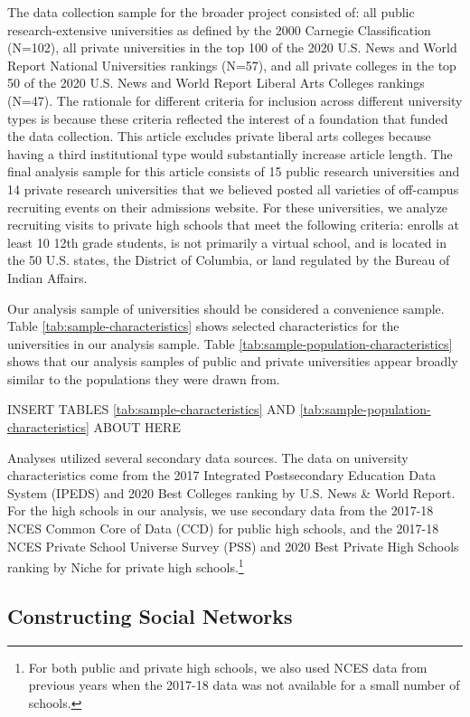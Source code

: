 \documentclass[
  12pt,
]{article}
\begin{document}
The data collection sample for the broader project consisted of: all public research-extensive universities as defined by the 2000 Carnegie Classification (N=102), all private universities in the top 100 of the 2020 U.S. News and World Report National Universities rankings (N=57), and all private colleges in the top 50 of the 2020 U.S. News and World Report Liberal Arts Colleges rankings (N=47). The rationale for different criteria for inclusion across different university types is because these criteria reflected the interest of a foundation that funded the data collection. This article excludes private liberal arts colleges because having a third institutional type would substantially increase article length. The final analysis sample for this article consists of 15 public research universities and 14 private research universities that we believed posted all varieties of off-campus recruiting events on their admissions website. For these universities, we analyze recruiting visits to private high schools that meet the following criteria: enrolls at least 10 12th grade students, is not primarily a virtual school, and is located in the 50 U.S. states, the District of Columbia, or land regulated by the Bureau of Indian Affairs.

Our analysis sample of universities should be considered a convenience sample. Table \ref{tab:sample-characteristics} shows selected characteristics for the universities in our analysis sample. Table \ref{tab:sample-population-characteristics} shows that our analysis samples of public and private universities appear broadly similar to the populations they were drawn from.

INSERT TABLES \ref{tab:sample-characteristics} AND \ref{tab:sample-population-characteristics} ABOUT HERE

Analyses utilized several secondary data sources. The data on university characteristics come from the 2017 Integrated Postsecondary Education Data System (IPEDS) and 2020 Best Colleges ranking by U.S. News \& World Report. For the high schools in our analysis, we use secondary data from the 2017-18 NCES Common Core of Data (CCD) for public high schools, and the 2017-18 NCES Private School Universe Survey (PSS) and 2020 Best Private High Schools ranking by Niche for private high schools.\footnote{For both public and private high schools, we also used NCES data from previous years when the 2017-18 data was not available for a small number of schools.}

\hypertarget{constructing-social-networks}{%
\subsection{Constructing Social Networks}\label{constructing-social-networks}}
\end{document}
